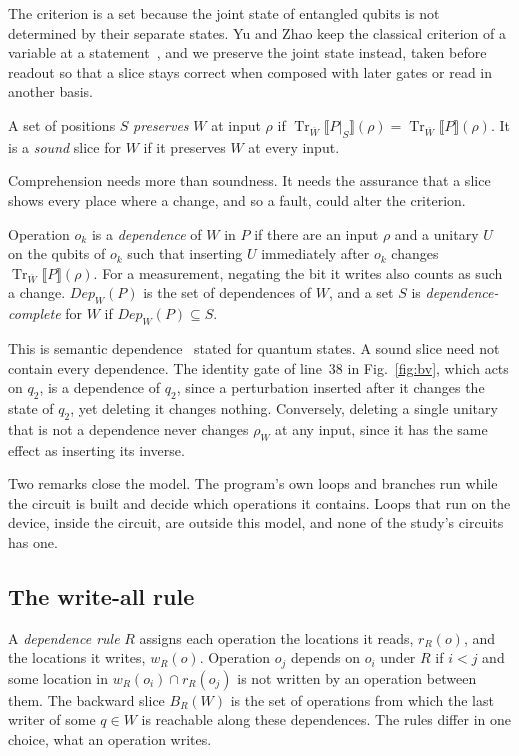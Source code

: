 The criterion is a set because the joint state of entangled qubits is not determined by their separate states. Yu
and Zhao keep the classical criterion of a variable at a statement~\cite{yu2025qpdg}, and we preserve the joint state
instead, taken before readout so that a slice stays correct when composed with later gates or read in another basis.

\begin{definition}[Soundness]\label{def:sound}
A set of positions $S$ \emph{preserves} $W$ at input $\rho$ if $\operatorname{Tr}_{\overline{W}}
\llbracket P|_S \rrbracket(\rho) = \operatorname{Tr}_{\overline{W}}\llbracket P \rrbracket(\rho)$. It is a
\emph{sound} slice for $W$ if it preserves $W$ at every input.
\end{definition}

Comprehension needs more than soundness. It needs the assurance that a slice shows every place where a change, and
so a fault, could alter the criterion.

\begin{definition}[Dependence]\label{def:dep}
Operation $o_k$ is a \emph{dependence} of $W$ in $P$ if there are an input $\rho$ and a unitary $U$ on the qubits
of $o_k$ such that inserting $U$ immediately after $o_k$ changes $\operatorname{Tr}_{\overline{W}}\llbracket P
\rrbracket(\rho)$. For a measurement, negating the bit it writes also counts as such a change. $\mathit{Dep}_W(P)$
is the set of dependences of $W$, and a set $S$ is \emph{dependence-complete} for $W$ if $\mathit{Dep}_W(P)
\subseteq S$.
\end{definition}

This is semantic dependence~\cite{podgurski1990formal} stated for quantum states. A sound slice need not contain
every dependence. The identity gate of line~38 in
Fig.~\ref{fig:bv}, which acts on $q_2$, is a dependence of $q_2$, since a perturbation inserted after it changes the
state of $q_2$, yet deleting it changes nothing. Conversely, deleting a single unitary that is not a dependence never changes
$\rho_W$ at any input, since it has the same effect as inserting its inverse.

Two remarks close the model. The program's own loops and branches run while the circuit is built and decide which operations it contains. Loops
that run on the device, inside the circuit, are outside this model, and none of the study's circuits has one.

\subsection{The write-all rule}
A \emph{dependence rule} $R$ assigns each operation the locations it reads, $r_R(o)$, and the locations it writes,
$w_R(o)$. Operation $o_j$ depends on $o_i$ under $R$ if $i < j$ and some location in $w_R(o_i) \cap r_R(o_j)$ is
not written by an operation between them. The backward slice $B_R(W)$ is the set of operations from which the
last writer of some $q \in W$ is reachable along these dependences. The rules differ in one choice, what an
operation writes.

